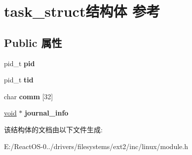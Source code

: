 \hypertarget{structtask__struct}{}\section{task\+\_\+struct结构体 参考}
\label{structtask__struct}
\subsection*{Public 属性}
\begin{DoxyCompactItemize}
\item 
\mbox{\label{structtask__struct_afc180f9e1e6ace46019d9560d008b515}} 
pid\+\_\+t {\bfseries pid}
\item 
\mbox{\label{structtask__struct_a9b76495e5b7cbb0bd92d7ea9471c92c6}} 
pid\+\_\+t {\bfseries tid}
\item 
\mbox{\label{structtask__struct_aa77631c7ea5243ce407eb4c4f871d33e}} 
char {\bfseries comm} \mbox{[}32\mbox{]}
\item 
\mbox{\label{structtask__struct_a1e1f4a60f7b09d201db6e5ef439085a3}} 
\hyperlink{interfacevoid}{void} $\ast$ {\bfseries journal\+\_\+info}
\end{DoxyCompactItemize}


该结构体的文档由以下文件生成\+:\begin{DoxyCompactItemize}
\item 
E\+:/\+React\+O\+S-\/0../drivers/filesystems/ext2/inc/linux/module.\+h\end{DoxyCompactItemize}
